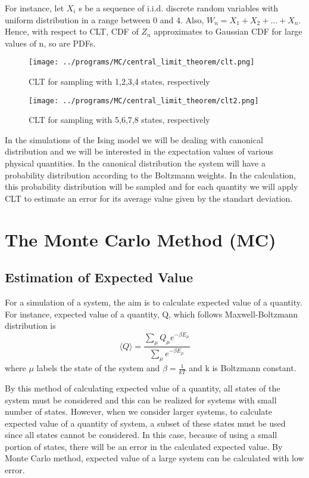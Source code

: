 \documentclass[12pt,fleqn]{report}
\begin{document}
For instance, let $X_i$ s be a sequence of i.i.d. discrete random variables with uniform distribution in a range between 0 and 4. Also, $ W_n = X_1 + X_2 + ... + X_n $. Hence, with respect to CLT, CDF of $Z_n$ approximates to Gaussian CDF for large values of n, so are PDFs.

\begin{figure}[ht!]
\centering
\texttt{[image: ../programs/MC/central\_limit\_theorem/clt.png]}
\caption{CLT for sampling with 1,2,3,4 states, respectively}
\end{figure}

\begin{figure}[ht!]
\centering
\texttt{[image: ../programs/MC/central\_limit\_theorem/clt2.png]}
\caption{CLT for sampling with 5,6,7,8 states, respectively}
\end{figure}

In the simulations of the Ising model we will be dealing with canonical distribution 
and we will be interested in the expectation values of various physical quantities. 
In the canonical distribution the system will have a probability distribution according 
to the Boltzmann weights. In the calculation, this probability distribution will be 
sampled and for each quantity we will apply CLT to estimate an error for its average 
value given by the standart deviation.

\chapter{The Monte Carlo Method (MC)}
\label{MC}

\section{Estimation of Expected Value} 

For a simulation of a system, the aim is to calculate expected value of a quantity. For instance, expected value of a quantity, Q, which follows Maxwell-Boltzmann distribution is 
$$
\langle Q \rangle = \frac{\sum\limits_{\mu} Q_\mu e^{-\beta E_\mu}}{\sum\limits_{\mu} e^{-\beta E_\mu}}
$$
where $\mu$ labels the state of the system and $\beta = \frac{1}{kT}$ and k is Boltzmann constant. 

By this method of calculating expected value of a quantity, all states of the system must be considered and this can be realized for systems with small number of states. However, when we consider larger systems, to calculate expected value of a quantity of system, a subset of these states must be used since all states cannot be considered. In this case, because of using a small portion of states, there will be an error in the calculated expected value. By Monte Carlo method, expected value of a large system can be calculated with low error. 
\end{document}
